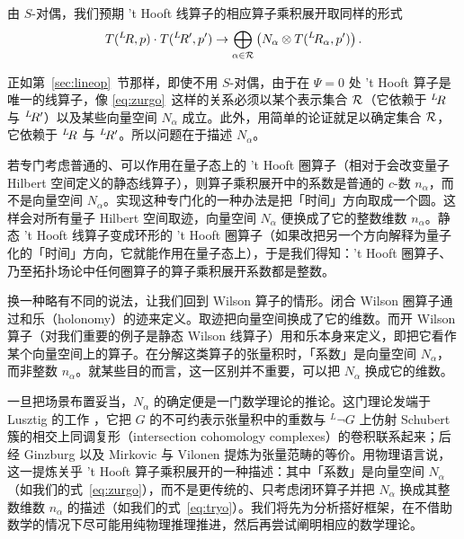 由 $S$-对偶，我们预期 't Hooft 线算子的相应算子乘积展开取同样的形式
\setcounter{equation}{22}
\begin{equation}\label{eq:zurgo}
T({}^L\negthinspace R,p)\cdot T({}^L\negthinspace
R',p')\to \bigoplus_{\alpha\in {\mathcal{R}}}\left(N_\alpha \otimes T({}^L\negthinspace
R_\alpha,p')\right).
\end{equation}

正如第~\ref{sec:lineop}~节那样，即使不用 $S$-对偶，由于在 $\Psi=0$ 处 't Hooft 算子是唯一的线算子，像 \eqref{eq:zurgo}\ 这样的关系必须以某个表示集合 ${\mathcal{R}}$（它依赖于 $^L\negthinspace R$ 与 $^L\negthinspace R'$）以及某些向量空间 $N_\alpha$ 成立。此外，用简单的论证就足以确定集合 ${\mathcal{R}}$，它依赖于 $^L\negthinspace R$ 与 $^L\negthinspace R'$。所以问题在于描述 $N_\alpha$。

若专门考虑普通的、可以作用在量子态上的 't Hooft 圈算子（相对于会改变量子 Hilbert 空间定义的静态线算子），则算子乘积展开中的系数是普通的 $c$-数 $n_\alpha$，而不是向量空间 $N_\alpha$。实现这种专门化的一种办法是把「时间」方向取成一个圆。这样会对所有量子 Hilbert 空间取迹，向量空间 $N_\alpha$ 便换成了它的整数维数 $n_\alpha$。静态 't Hooft 线算子变成环形的 't Hooft 圈算子（如果改把另一个方向解释为量子化的「时间」方向，它就能作用在量子态上），于是我们得知：'t Hooft 圈算子、乃至拓扑场论中任何圈算子的算子乘积展开系数都是整数。

换一种略有不同的说法，让我们回到 Wilson 算子的情形。闭合 Wilson 圈算子通过和乐（holonomy）的迹来定义。取迹把向量空间换成了它的维数。而开 Wilson 算子（对我们重要的例子是静态 Wilson 线算子）用和乐本身来定义，即把它看作某个向量空间上的算子。在分解这类算子的张量积时，「系数」是向量空间 $N_\alpha$，而非整数 $n_\alpha$。就某些目的而言，这一区别并不重要，可以把 $N_\alpha$ 换成它的维数。

\par{}

一旦把场景布置妥当，$N_\alpha$ 的确定便是一门数学理论的推论。这门理论发端于 Lusztig 的工作 \cite{ref98}，它把 $G$ 的不可约表示张量积中的重数与 $^L\neg G$ 上仿射 Schubert 簇的相交上同调复形（intersection cohomology complexes）的卷积联系起来；后经 Ginzburg \cite{ref96} 以及 Mirkovic 与 Vilonen \cite{ref97} 提炼为张量范畴的等价。用物理语言说，这一提炼关乎 't Hooft 算子乘积展开的一种描述：其中「系数」是向量空间 $N_\alpha$（如我们的式~\eqref{eq:zurgo}），而不是更传统的、只考虑闭环算子并把 $N_\alpha$ 换成其整数维数 $n_\alpha$ 的描述（如我们的式~\eqref{eq:tryo}）。我们将先为分析搭好框架，在不借助数学的情况下尽可能用纯物理推理推进，然后再尝试阐明相应的数学理论。

